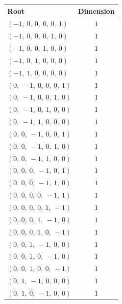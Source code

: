\documentclass[11pt]{article}
\theoremstyle{definition}
\begin{document}
\begin{center}
\begin{tabular}{|l|c|}
\hline
Root & Dimension \\
\hline
$\left( -1, \  0, \  0, \  0, \  0, \  1\right)$ & $1$ \\
\hline
$\left( -1, \  0, \  0, \  0, \  1, \  0\right)$ & $1$ \\
\hline
$\left( -1, \  0, \  0, \  1, \  0, \  0\right)$ & $1$ \\
\hline
$\left( -1, \  0, \  1, \  0, \  0, \  0\right)$ & $1$ \\
\hline
$\left( -1, \  1, \  0, \  0, \  0, \  0\right)$ & $1$ \\
\hline
$\left( 0, \  -1, \  0, \  0, \  0, \  1\right)$ & $1$ \\
\hline
$\left( 0, \  -1, \  0, \  0, \  1, \  0\right)$ & $1$ \\
\hline
$\left( 0, \  -1, \  0, \  1, \  0, \  0\right)$ & $1$ \\
\hline
$\left( 0, \  -1, \  1, \  0, \  0, \  0\right)$ & $1$ \\
\hline
$\left( 0, \  0, \  -1, \  0, \  0, \  1\right)$ & $1$ \\
\hline
$\left( 0, \  0, \  -1, \  0, \  1, \  0\right)$ & $1$ \\
\hline
$\left( 0, \  0, \  -1, \  1, \  0, \  0\right)$ & $1$ \\
\hline
$\left( 0, \  0, \  0, \  -1, \  0, \  1\right)$ & $1$ \\
\hline
$\left( 0, \  0, \  0, \  -1, \  1, \  0\right)$ & $1$ \\
\hline
$\left( 0, \  0, \  0, \  0, \  -1, \  1\right)$ & $1$ \\
\hline
$\left( 0, \  0, \  0, \  0, \  1, \  -1\right)$ & $1$ \\
\hline
$\left( 0, \  0, \  0, \  1, \  -1, \  0\right)$ & $1$ \\
\hline
$\left( 0, \  0, \  0, \  1, \  0, \  -1\right)$ & $1$ \\
\hline
$\left( 0, \  0, \  1, \  -1, \  0, \  0\right)$ & $1$ \\
\hline
$\left( 0, \  0, \  1, \  0, \  -1, \  0\right)$ & $1$ \\
\hline
$\left( 0, \  0, \  1, \  0, \  0, \  -1\right)$ & $1$ \\
\hline
$\left( 0, \  1, \  -1, \  0, \  0, \  0\right)$ & $1$ \\
\hline
$\left( 0, \  1, \  0, \  -1, \  0, \  0\right)$ & $1$ \\

\end{tabular}
\end{center}
\end{document}
